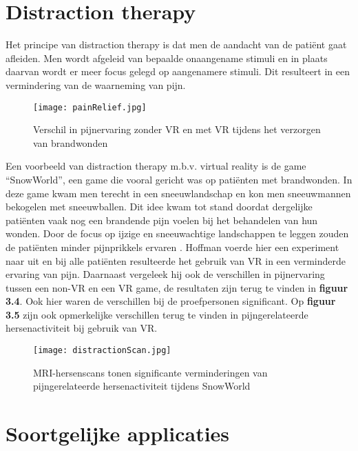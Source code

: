 \section{Distraction therapy}
Het principe van distraction therapy is dat men de aandacht van de patiënt gaat afleiden. Men wordt afgeleid van bepaalde onaangename stimuli en in plaats daarvan wordt er meer focus gelegd op aangenamere stimuli. Dit resulteert in een vermindering van de waarneming van pijn. 

\begin{figure}[h]
    \centering
    \texttt{[image: painRelief.jpg]}
    \caption{ Verschil in pijnervaring zonder VR en met VR tijdens het verzorgen van brandwonden \autocite{Panjwani2017}}
\end{figure}

\newpage

Een voorbeeld van distraction therapy m.b.v. virtual reality is de game “SnowWorld”, een game die vooral gericht was op patiënten met brandwonden. In deze game kwam men terecht in een sneeuwlandschap en kon men sneeuwmannen bekogelen met sneeuwballen. Dit idee kwam tot stand doordat dergelijke patiënten vaak nog een brandende pijn voelen bij het behandelen van hun wonden. Door de focus op ijzige en sneeuwachtige landschappen te leggen zouden de patiënten minder pijnprikkels ervaren \autocite{Panjwani2017} .
Hoffman voerde hier een experiment naar uit en bij alle patiënten resulteerde het gebruik van VR in een verminderde ervaring van pijn. Daarnaast vergeleek hij ook de verschillen in pijnervaring tussen een non-VR en een VR game, de resultaten zijn terug te vinden in \textbf{figuur 3.4}. Ook hier waren de verschillen bij de proefpersonen significant. Op \textbf{figuur 3.5} zijn ook opmerkelijke verschillen terug te vinden in pijngerelateerde hersenactiviteit bij gebruik van VR.

\begin{figure}[h]
    \centering
    \texttt{[image: distractionScan.jpg]}
    \caption{MRI-hersenscans tonen significante verminderingen van pijngerelateerde hersenactiviteit tijdens SnowWorld \autocite{Washington2017}}
\end{figure}

\section{Soortgelijke applicaties}
